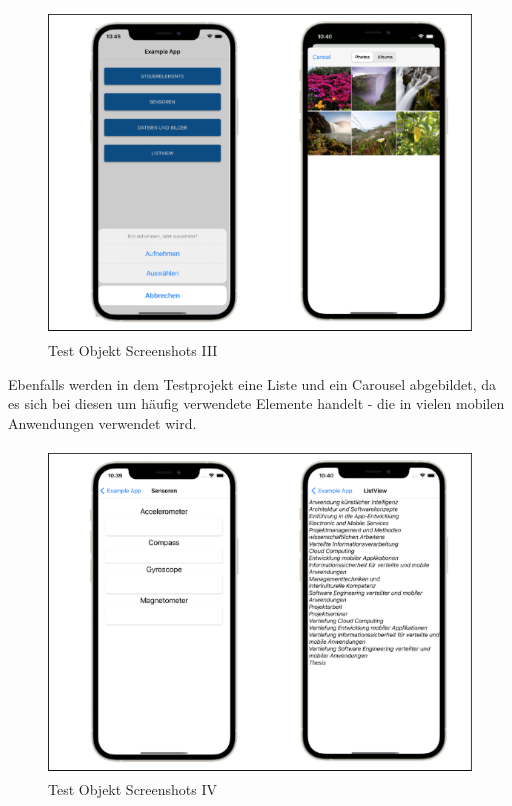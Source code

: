 \begin{figure}[!ht]
 \includegraphics[width=\textwidth,keepaspectratio]{Images/Screenshot/Images.png}
 \caption{Test Objekt Screenshots III}
 \label{fig:TestObjectIII}
\end{figure}

Ebenfalls werden in dem Testprojekt eine Liste und ein Carousel abgebildet,  da es sich bei diesen um häufig verwendete Elemente handelt - die in vielen mobilen Anwendungen verwendet wird. 

\begin{figure}[!ht]
 \includegraphics[width=\textwidth,keepaspectratio]{Images/Screenshot/Sensors.png}
 \caption{Test Objekt Screenshots IV}
 \label{fig:TestObjectIV}
\end{figure}




